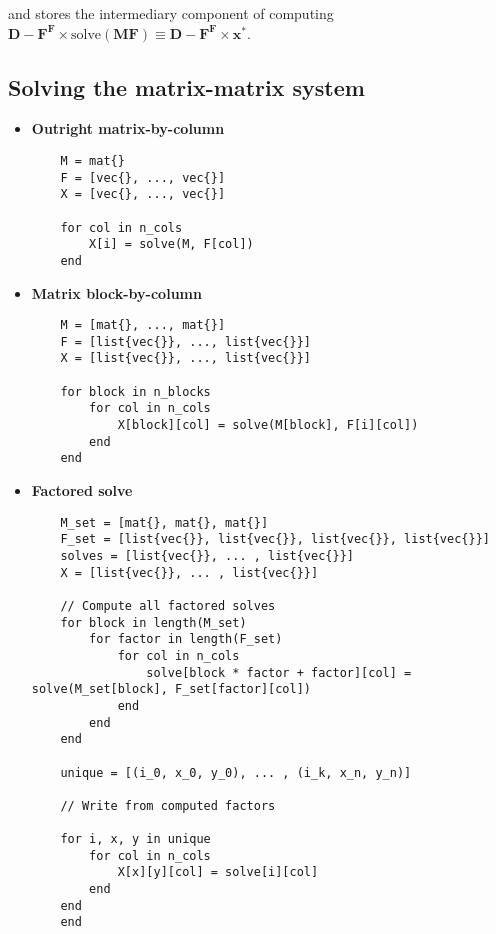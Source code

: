 \noindent and stores the intermediary component of computing $\textbf{D} - \textbf{F}^\textbf{F} \times \text{solve}(\textbf{MF}) \equiv \textbf{D} - \textbf{F}^\textbf{F} \times \textbf{x}^{*}$.


\noindent

\subsection{Solving the matrix-matrix system}

\begin{itemize}
    \item \textbf{Outright matrix-by-column} 
    \begin{lstlisting} 
    M = mat{}
    F = [vec{}, ..., vec{}]
    X = [vec{}, ..., vec{}]

    for col in n_cols
        X[i] = solve(M, F[col])
    end\end{lstlisting}
    \item \textbf{Matrix block-by-column} 
    \begin{lstlisting} 
    M = [mat{}, ..., mat{}]
    F = [list{vec{}}, ..., list{vec{}}]
    X = [list{vec{}}, ..., list{vec{}}]

    for block in n_blocks
        for col in n_cols
            X[block][col] = solve(M[block], F[i][col])
        end
    end\end{lstlisting}

    \item \textbf{Factored solve} 
    \begin{lstlisting} 
    M_set = [mat{}, mat{}, mat{}]
    F_set = [list{vec{}}, list{vec{}}, list{vec{}}, list{vec{}}]
    solves = [list{vec{}}, ... , list{vec{}}]
    X = [list{vec{}}, ... , list{vec{}}]

    // Compute all factored solves 
    for block in length(M_set) 
        for factor in length(F_set)
            for col in n_cols
                solve[block * factor + factor][col] = solve(M_set[block], F_set[factor][col])
            end
        end
    end

    unique = [(i_0, x_0, y_0), ... , (i_k, x_n, y_n)]

    // Write from computed factors 

    for i, x, y in unique 
        for col in n_cols 
            X[x][y][col] = solve[i][col]
        end
    end
    end\end{lstlisting}

\end{itemize}
